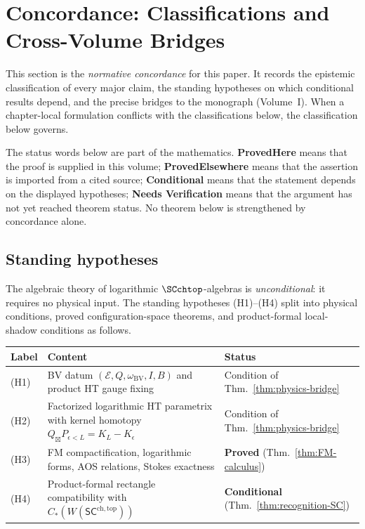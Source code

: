 
\section{Concordance: Classifications and Cross-Volume Bridges}

\begin{remark}
This section is the \emph{normative concordance} for this paper. It records the epistemic classification of every major claim, the standing hypotheses on which conditional results depend, and the precise bridges to the monograph (Volume~I). When a chapter-local formulation conflicts with the classifications below, the classification below governs.
\end{remark}

\begin{remark}
The status words below are part of the mathematics. \textbf{ProvedHere}
means that the proof is supplied in this volume; \textbf{ProvedElsewhere}
means that the assertion is imported from a cited source; \textbf{Conditional}
means that the statement depends on the displayed hypotheses; \textbf{Needs
Verification} means that the argument has not yet reached theorem status.
No theorem below is strengthened by concordance alone.
\end{remark}

\subsection{Standing hypotheses}

The algebraic theory of logarithmic $\SCchtop$-algebras is
\emph{unconditional}: it requires no physical input. The standing
hypotheses (H1)--(H4) split into physical conditions, proved
configuration-space theorems, and product-formal local-shadow
conditions as follows.

\begin{center}
\begin{tabular}{lp{}l}
\textbf{Label} & \textbf{Content} & \textbf{Status} \\
\hline
(H1) & BV datum $(\mathcal E,Q,\omega_{\mathrm{BV}},I,B)$ and product HT gauge fixing & Condition of Thm.~\ref{thm:physics-bridge} \\
(H2) & Factorized logarithmic HT parametrix with kernel homotopy $Q_{\boxtimes}P_{\epsilon<L}=K_L-K_\epsilon$ & Condition of Thm.~\ref{thm:physics-bridge} \\
(H3) & FM compactification, logarithmic forms, AOS relations, Stokes exactness & \textbf{Proved} (Thm.~\ref{thm:FM-calculus}) \\
(H4) & Product-formal rectangle compatibility with $C_\ast(W(\mathsf{SC}^{\mathrm{ch,top}}))$ & \textbf{Conditional} (Thm.~\ref{thm:recognition-SC}) \\
\end{tabular}
\end{center}


